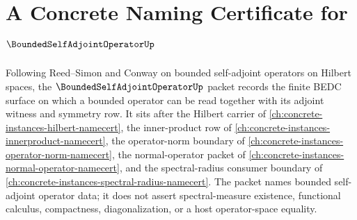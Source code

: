 \chapter{A Concrete Naming Certificate for $\BoundedSelfAdjointOperatorUp$}
\label{ch:concrete-instances-bounded-self-adjoint-operator-namecert}

Following Reed--Simon and Conway on bounded self-adjoint operators on Hilbert spaces, the $\BoundedSelfAdjointOperatorUp$ packet records the finite BEDC surface on which a bounded operator can be read together with its adjoint witness and symmetry row. It sits after the Hilbert carrier of \autoref{ch:concrete-instances-hilbert-namecert}, the inner-product row of \autoref{ch:concrete-instances-innerproduct-namecert}, the operator-norm boundary of \autoref{ch:concrete-instances-operator-norm-namecert}, the normal-operator packet of \autoref{ch:concrete-instances-normal-operator-namecert}, and the spectral-radius consumer boundary of \autoref{ch:concrete-instances-spectral-radius-namecert}. The packet names bounded self-adjoint operator data; it does not assert spectral-measure existence, functional calculus, compactness, diagonalization, or a host operator-space equality.

